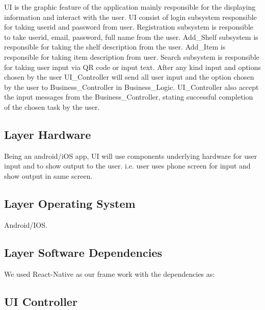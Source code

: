 UI is the graphic feature of the application mainly responsible for the displaying information and interact with the user. UI consist of login subsystem responsible for taking userid and password from user. Registration subsystem is responsible to take userid, email, password, full name from the user. Add\_Shelf subsystem is responsible for taking the shelf description from the user. Add\_Item is responsible for taking item description from user. Search subsystem is responsible for taking user input via QR code or input text. After any kind input and options chosen by the user UI\_Controller will send all user input and the option chosen by the user to Business\_Controller in Business\_Logic. UI\_Controller also accept the input messages from the Business\_Controller, stating successful completion of the chosen task by the user.

\subsection{Layer Hardware}
Being an android/iOS app, UI will use components underlying hardware for user input and to show output to the user. i.e. user uses phone screen for input and show output in same screen.

\subsection{Layer Operating System}
Android/IOS.

\subsection{Layer Software Dependencies}
We used React-Native as our frame work with the dependencies as:
\begin{rand}\\dependencies:\\ {
    "expo": "34.0.1",\\
    "expo-permissions": "6.0.0",\\
    "native-base": "2.13.7",\\
    "react": "16.8.3",\\
    "react-native": 
\end{rand}

\subsection{UI Controller}

